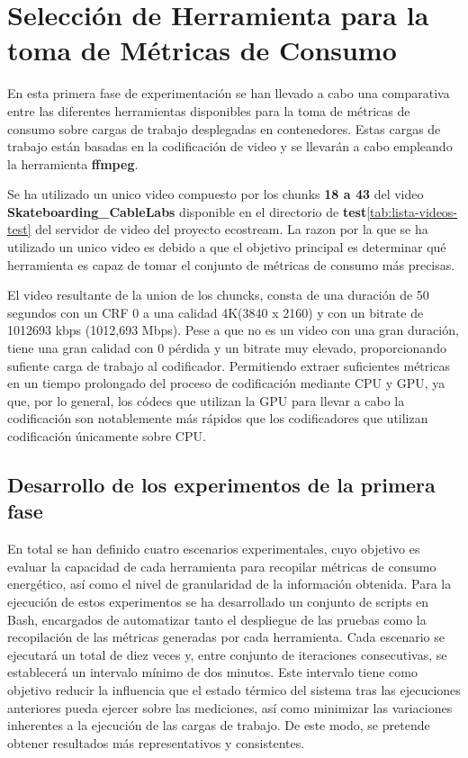\section{Selección de Herramienta para la toma de Métricas de Consumo}\label{exp1-selecttool}
En esta primera fase de experimentación se han llevado a cabo una comparativa entre las diferentes herramientas disponibles para la toma de métricas de consumo sobre cargas de trabajo desplegadas en contenedores. Estas cargas de trabajo están basadas en la codificación de video y se llevarán a cabo empleando la herramienta \textbf{ffmpeg}.

Se ha utilizado un unico video compuesto por los chunks \textbf{18 a 43} del video \textbf{Skateboarding\_CableLabs} disponible en el directorio de \textbf{test}\ref{tab:lista-videos-test} del servidor de video del proyecto ecostream. La razon por la que se ha utilizado un unico video es debido a que el objetivo principal es determinar qué herramienta es capaz de tomar el conjunto de métricas de consumo más precisas.

El video resultante de la union de los chuncks, consta de una duración de 50 segundos con un CRF 0 a una calidad 4K(3840 x 2160) y con un bitrate de 1012693 kbps (1012,693 Mbps). Pese a que no es un video con una gran duración, tiene una gran calidad con 0 pérdida y un bitrate muy elevado, proporcionando sufiente carga de trabajo al codificador. Permitiendo extraer suficientes métricas  en un tiempo prolongado del proceso de codificación mediante CPU y GPU, ya que, por lo general, los códecs que utilizan la GPU para llevar a cabo la codificación son notablemente más rápidos que los codificadores que utilizan codificación únicamente sobre CPU.

\subsection{Desarrollo de los experimentos de la primera fase}

 En total se han definido cuatro escenarios experimentales, cuyo objetivo es evaluar la capacidad de cada herramienta para recopilar métricas de consumo energético, así como el nivel de granularidad de la información obtenida. Para la ejecución de estos experimentos se ha desarrollado un conjunto de scripts en Bash, encargados de automatizar tanto el despliegue de las pruebas como la recopilación de las métricas generadas por cada herramienta. Cada escenario se ejecutará un total de diez veces y, entre conjunto de iteraciones consecutivas, se establecerá un intervalo mínimo de dos minutos. Este intervalo tiene como objetivo reducir la influencia que el estado térmico del sistema tras las ejecuciones anteriores pueda ejercer sobre las mediciones, así como minimizar las variaciones inherentes a la ejecución de las cargas de trabajo. De este modo, se pretende obtener resultados más representativos y consistentes.
 
